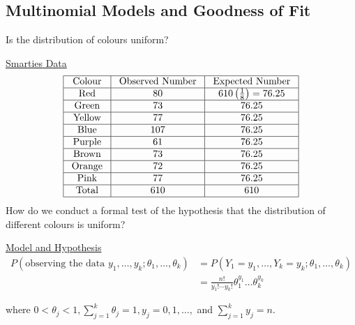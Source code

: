 \subsection{Multinomial Models and Goodness of Fit}
Is the distribution of colours uniform?

\underline{Smarties Data}
\[ \begin{array}{|c|c|c|}
        \hline
        \text { Colour } & \text { Observed Number } & \text { Expected Number }         \\
        \hline
        \text { Red }    & 80                        & 610\left(\frac{1}{8}\right)=76.25 \\
        \hline
        \text { Green }  & 73                        & 76.25                             \\
        \hline
        \text { Yellow } & 77                        & 76.25                             \\
        \hline
        \text { Blue }   & 107                       & 76.25                             \\
        \hline
        \text { Purple } & 61                        & 76.25                             \\
        \hline
        \text { Brown }  & 73                        & 76.25                             \\
        \hline
        \text { Orange } & 72                        & 76.25                             \\
        \hline
        \text { Pink }   & 77                        & 76.25                             \\
        \hline
        \text { Total }  & 610                       & 610                               \\
        \hline
    \end{array} \]
How do we conduct a formal test of the hypothesis that the distribution of different
colours is uniform?

\underline{Model and Hypothesis}
\begin{align*}
    P\left(\text {observing the data } y_{1}, \ldots, y_{k} ; \theta_{1}, \ldots, \theta_{k}\right)
     & =P\left(Y_{1}=y_{1}, \ldots, Y_{k}=y_{k} ; \theta_{1}, \ldots, \theta_{k}\right) \\
     & =\frac{n !}{y_{1} ! \cdots y_{k} !} \theta_{1}^{y_{1}} \dots \theta_{k}^{y_{k}}
\end{align*}

where $0<\theta_{j}<1, \sum_{j=1}^{k} \theta_{j}=1, y_{j}=0,1, \ldots,$ and $\sum_{j=1}^{k} y_{j}=n$.

